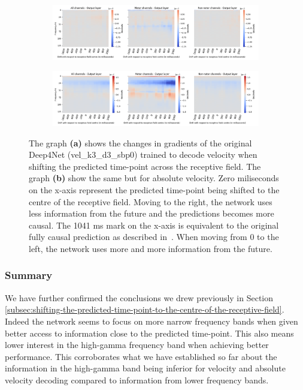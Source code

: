 \begin{figure}[!htbp]
\begin{subfigure}[a]{\textwidth}
   \includegraphics[width=1\linewidth]{img/ch4/vel-shifted-gradients}
   \caption{}
   \label{fig:vel-shifting-gradients}
\end{subfigure}

\begin{subfigure}[b]{\textwidth}
   \includegraphics[width=1\linewidth]{img/ch4/absVel-shifted-gradients}
   \caption{}
   \label{fig:absVel-shiftig-gradients}
\end{subfigure}
\caption[Gradual shifting - gradients]{The graph \textbf{(a)} shows the changes in gradients of the original Deep4Net (vel\_k3\_d3\_sbp0) trained to decode velocity when shifting the predicted time-point across the receptive field.
The graph \textbf{(b)} show the same but for absolute velocity. Zero miliseconds on the x-axis represent the predicted time-point being shifted to the centre of the receptive field.
Moving to the right, the network uses less information from the future and the predictions becomes more causal.
The 1041 ms mark on the x-axis is equivalent to the original fully causal prediction as described in~\cite{Hammer-2021}.
When moving from 0 to the left, the network uses more and more information from the future.}
\label{fig:shifting-gradients}
\end{figure}

\subsubsection{Summary}\label{subsubsec:across-shiftig-summary}
We have further confirmed the conclusions we drew previously in Section \ref{subsec:shifting-the-predicted-time-point-to-the-centre-of-the-receptive-field}. 
Indeed the network seems to focus on more narrow frequency bands when given better access to information close to the predicted time-point.
This also means lower interest in the high-gamma frequency band when achieving better performance.
This corroborates what we have established so far about the information in the high-gamma band being inferior for velocity and absolute velocity decoding compared to information from lower frequency bands. 


